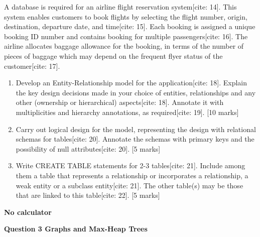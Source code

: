 A database is required for an airline flight reservation system[cite: 14]. This system enables customers to book flights by selecting the flight number, origin, destination, departure date, and time[cite: 15]. Each booking is assigned a unique booking ID number and contains booking for multiple passengers[cite: 16]. The airline allocates baggage allowance for the booking, in terms of the number of pieces of baggage which may depend on the frequent flyer status of the customer[cite: 17].
\begin{enumerate}
    \item[(a)] Develop an Entity-Relationship model for the application[cite: 18]. Explain the key design decisions made in your choice of entities, relationships and any other (ownership or hierarchical) aspects[cite: 18]. Annotate it with multiplicities and hierarchy annotations, as required[cite: 19]. [10 marks]
    \item[(b)] Carry out logical design for the model, representing the design with relational schemas for tables[cite: 20]. Annotate the schemas with primary keys and the possibility of null attributes[cite: 20]. [5 marks]
    \item[(c)] Write CREATE TABLE statements for 2-3 tables[cite: 21]. Include among them a table that represents a relationship or incorporates a relationship, a weak entity or a subclass entity[cite: 21]. The other table(s) may be those that are linked to this table[cite: 22]. [5 marks]
\end{enumerate}

\textbf{No calculator}

\textbf{Question 3 Graphs and Max-Heap Trees}

